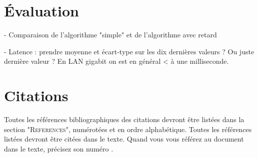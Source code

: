 \documentclass{article}
\begin{document}
\section{Évaluation}\label{sec.evaluation}
- Comparaison de l'algorithme "simple" et de l'algorithme avec retard


- Latence : prendre moyenne et écart-type sur les dix dernières valeurs ? Ou juste dernière valeur ?
En LAN gigabit on est en général < à une milliseconde.

\section{Citations}

Toutes les références bibliographiques des citations devront être listées dans la section "\textsc{References}", numérotées et en ordre alphabétique. Toutes les références  listées devront être citées dans le texte. Quand  vous vous référez au document dans le texte, précisez son numéro \cite{Author:00}.


\end{document}
